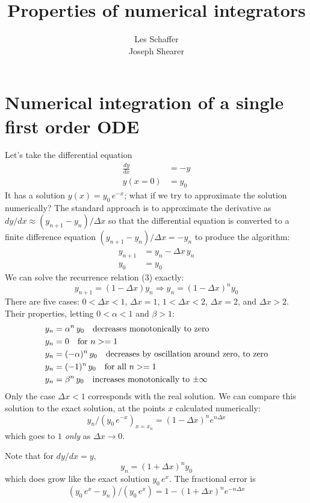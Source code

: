 \documentclass[12pt]{article}
\title{Properties of numerical integrators}
\author{Les Schaffer\\ Joseph Shearer}
\begin{document}
\maketitle
\section{Numerical integration of a single first order ODE}
Let's take the differential equation
\begin{align}
\frac{dy}{dx}&=-y\\
y(x=0)&=y_0
\end{align}
It has a solution $y(x) = y_0\, e^{-x}$; what if we try to approximate the solution numerically? The standard approach is to approximate the derivative as $dy/dx\approx (y_{n+1} - y_n)/\Delta x$ so that the differential equation is converted to a finite difference equation $(y_{n+1} - y_n)/\Delta x = - y_n$ to produce the algorithm:
\begin{align}
y_{n+1} &= y_n - \Delta x\, y_n\\
y_0 &= y_0
\end{align}
We can solve the recurrence relation (3) exactly:
\begin{equation}
y_{n+1} = (1-\Delta x) y_n \Longrightarrow y_n = (1-\Delta x)^n y_0
\end{equation}
There are five cases: $0<\Delta x<1$, $\Delta x = 1$, $1<\Delta x <2$, $\Delta x = 2$, and $\Delta x > 2$. Their properties, letting $0<\alpha<1$ and $\beta>1$:
\begin{align}
y_n &= \alpha^n\, y_0 \quad\hbox{\rm decreases monotonically to zero}\\
y_n &= 0 \quad \hbox{\rm for $n>=1$}\\
y_n &= (-\alpha)^n\, y_0 \quad\hbox{\rm decreases by oscillation around zero, to zero}\\
y_n &= (-1)^n\, y_0\quad\hbox{\rm for all $n>=1$}\\
y_n &= \beta^n\, y_0\quad\hbox{\rm increases monotonically to  $\pm\infty$}
\end{align}
Only the case $\Delta x < 1$ corresponds with the real solution. We can compare this solution to the exact solution, at the points $x$ calculated numerically:
\begin{equation}
y_n/(y_0\, e^{-x})_{x=x_n} = (1-\Delta x)^n e^{n\Delta x}
\end{equation}
which goes to $1$ {\it only} as $\Delta x\to 0$. 

Note that for $dy/dx = y$, 
\begin{equation}
y_n = (1+\Delta x)^n y_0
\end{equation}
which does grow like the exact solution $y_0 \, e^x$. The fractional error is
\begin{equation}
(y_0\, e^x - y_n)/(y_0\, e^x) = 1 - (1+\Delta x)^n e^{-n \Delta x}
\end{equation}
\end{document}
